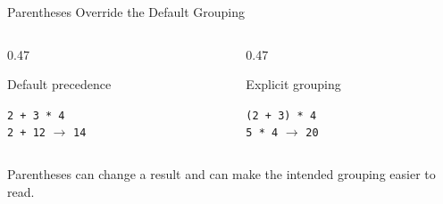 \documentclass[aspectratio=169,10pt]{beamer}
\begin{document}
\begin{frame}{Parentheses Override the Default Grouping}

  \begin{columns}[T,onlytextwidth]

    \begin{column}{0.47\textwidth}

      \begin{block}{Default precedence}

        \begin{center}
          {\Large \texttt{2 + 3 * 4}}\\[0.10in]
          \texttt{2 + 12} $\rightarrow$ \texttt{14}
        \end{center}

      \end{block}

    \end{column}

    \begin{column}{0.47\textwidth}

      \begin{block}{Explicit grouping}

        \begin{center}
          {\Large \texttt{(2 + 3) * 4}}\\[0.10in]
          \texttt{5 * 4} $\rightarrow$ \texttt{20}
        \end{center}

      \end{block}

    \end{column}

  \end{columns}

  \begin{keyidea}

    Parentheses can change a result and can make the intended grouping easier to read.

  \end{keyidea}

\end{frame}
\end{document}
